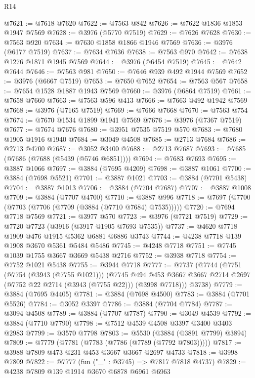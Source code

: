 \begin{lexlean}{R14}
\begin{coremodule}
@7621 := @7618 @7620
@7622 := @7563 @842
@7626 := @7622 @1836 @1853 @1947 @7569
@7628 := @3976 (@5770 @7519)
@7629 := @7626 @7628
@7630 := @7563 @920
@7634 := @7630 @1858 @1866 @1946 @7569
@7636 := @3976 (@6177 @7519)
@7637 := @7634 @7636
@7638 := @7563 @970
@7642 := @7638 @1276 @1871 @1945 @7569
@7644 := @3976 (@6454 @7519)
@7645 := @7642 @7644
@7646 := @7563 @981
@7650 := @7646 @939 @492 @1944 @7569
@7652 := @3976 (@6667 @7519)
@7653 := @7650 @7652
@7654 := @7563 @567
@7658 := @7654 @1528 @1887 @1943 @7569
@7660 := @3976 (@6864 @7519)
@7661 := @7658 @7660
@7663 := @7563 @596 @413
@7666 := @7663 @492 @1942 @7569
@7668 := @3976 (@7165 @7519)
@7669 := @7666 @7668
@7670 := @7563 @754
@7674 := @7670 @1534 @1899 @1941 @7569
@7676 := @3976 (@7367 @7519)
@7677 := @7674 @7676
@7680 := @3951 @7535 @7519 @570
@7683 := @7680 @1905 @1916 @1940
@7684 := @3049 @4508
@7685 := @2713 @7684
@7686 := @2713 @4700
@7687 := @3052 @3400
@7688 := @2713 @7687
@7693 := @7685 (@7686 (@7688 (@5439 (@5746 @6851))))
@7694 := @7683 @7693
@7695 := @3887 @1066
@7697 := @3884 (@7695 @4209)
@7698 := @3887 @1061
@7700 := @3884 (@7698 @5521)
@7701 := @3887 @1021
@7703 := @3884 (@7701 @5438)
@7704 := @3887 @1013
@7706 := @3884 (@7704 @7687)
@7707 := @3887 @1008
@7709 := @3884 (@7707 @4700)
@7710 := @3887 @996
@7718 := @7697 (@7700 (@7703 (@7706 (@7709 (@3884 (@7710 @7684) @7535)))))
@7720 := @7694 @7718 @7569
@7721 := @3977 @570
@7723 := @3976 (@7721 @7519)
@7729 := @7720 @7723 (@3916 (@3917 @1905 @7693 @7535))
@7737 := @4620 @7718 @1909 @476 @1915 @5362 @6881 @6886 @3743
@7744 := @4238 @7718 @139 @1908 @3670 @5361 @5484 @5486
@7745 := @4248 @7718
@7751 := @7745 @1039 @1755 @3667 @3669 @5438 @2716
@7752 := @3938 @7718
@7754 := @7752 @1021 @5438
@7755 := @3944 @7718
@7777 := @7737
    (@7744
      (@7751
        (@7754 (@3943 (@7755 @1021)))
        (@7745
          @494
          @453
          @3667
          @3667
          @2714
          @2697
          (@7752 @22 @2714 (@3943 (@7755 @22)))
          (@3998 @7718)))
      @3738)
@7779 := @3884 (@7695 @4405)
@7781 := @3884 (@7698 @4500)
@7783 := @3884 (@7701 @5526)
@7784 := @3052 @3397
@7786 := @3884 (@7704 @7784)
@7787 := @3094 @4508
@7789 := @3884 (@7707 @7787)
@7790 := @3049 @4539
@7792 := @3884 (@7710 @7790)
@7798 := @7512 @4539 @4508 @3397 @3400 @3403 @2983
@7799 := @3570 @7798
@7803 := @5530 (@3884 (@3891 @7799) @3894)
@7809 := @7779 (@7781 (@7783 (@7786 (@7789 (@7792 @7803)))))
@7817 := @3988 @7809 @473 @231 @453 @3667 @3667 @2697 @4733
@7818 := @3998 @7809
@7822 := @7777 (fun ("_" : @3745) => @7817 @7818 @4737)
@7829 := @4238 @7809 @139 @1914 @3670 @6878 @6961 @6963

\end{coremodule}
\end{lexlean}
